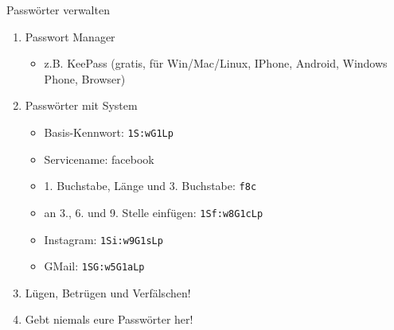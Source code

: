 \begin{frame}{Passwörter verwalten}
  \begin{enumerate}
    \item<1-> Passwort Manager
      \begin{itemize}
        \item<2-> z.B. KeePass \tiny{(gratis, für Win/Mac/Linux, IPhone, Android, Windows Phone, Browser)}
      \end{itemize}
    \item<3-> Passwörter mit System
      \begin{itemize}
        \item<4->Basis-Kennwort: \hfill{\texttt{1S:wG1Lp}}
	\item<5->Servicename: \hfill{facebook}
	\item<6->1. Buchstabe, Länge und 3. Buchstabe: \hfill{\texttt{f8c}}
	\item<7->an 3., 6. und 9. Stelle einfügen: \hfill{\texttt{1S\alert{f}:w\alert{8}G1\alert{c}Lp}}
	\item<8->Instagram: \hfill{\texttt{1Si:w9G1sLp}}
	\item<9->GMail: \hfill{\texttt{1SG:w5G1aLp}}
      \end{itemize}
    \item<10-> Lügen, Betrügen und Verfälschen!
    \item<11-> \alert{Gebt niemals eure Passwörter her!}


  \end{enumerate}

\end{frame}

